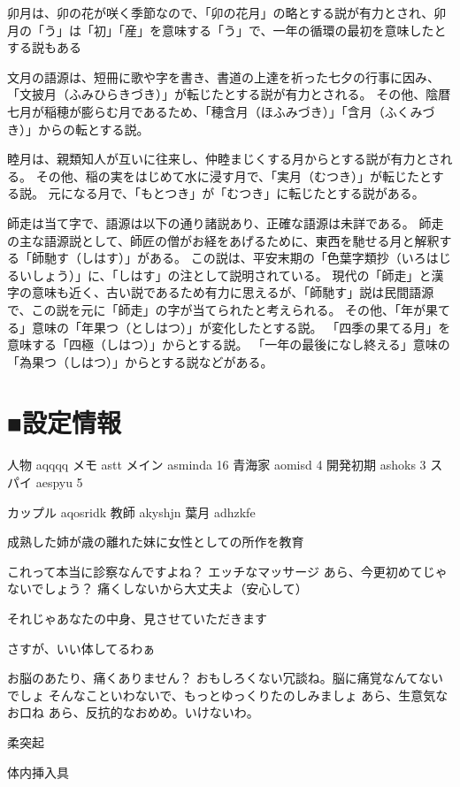 卯月は、卯の花が咲く季節なので、「卯の花月」の略とする説が有力とされ、卯月の「う」は「初」「産」を意味する「う」で、一年の循環の最初を意味したとする説もある

文月の語源は、短冊に歌や字を書き、書道の上達を祈った七夕の行事に因み、「文披月（ふみひらきづき）」が転じたとする説が有力とされる。
その他、陰暦七月が稲穂が膨らむ月であるため、「穂含月（ほふみづき）」「含月（ふくみづき）」からの転とする説。

睦月は、親類知人が互いに往来し、仲睦まじくする月からとする説が有力とされる。
その他、稲の実をはじめて水に浸す月で、「実月（むつき）」が転じたとする説。
元になる月で、「もとつき」が「むつき」に転じたとする説がある。

師走は当て字で、語源は以下の通り諸説あり、正確な語源は未詳である。
師走の主な語源説として、師匠の僧がお経をあげるために、東西を馳せる月と解釈する「師馳す（しはす）」がある。
この説は、平安末期の「色葉字類抄（いろはじるいしょう）」に、「しはす」の注として説明されている。
現代の「師走」と漢字の意味も近く、古い説であるため有力に思えるが、「師馳す」説は民間語源で、この説を元に「師走」の字が当てられたと考えられる。
その他、「年が果てる」意味の「年果つ（としはつ）」が変化したとする説。
「四季の果てる月」を意味する「四極（しはつ）」からとする説。
「一年の最後になし終える」意味の「為果つ（しはつ）」からとする説などがある。



\section{■設定情報}

人物 aqqqq
メモ astt
メイン asminda 16
青海家 aomisd 4
開発初期 ashoks 3
スパイ aespyu 5

カップル aqosridk
教師 akyshjn
葉月 adhzkfe

成熟した姉が歳の離れた妹に女性としての所作を教育

これって本当に診察なんですよね？
エッチなマッサージ 
あら、今更初めてじゃないでしょう？
痛くしないから大丈夫よ（安心して）

それじゃあなたの中身、見させていただきます

さすが、いい体してるわぁ

お脳のあたり、痛くありません？
おもしろくない冗談ね。脳に痛覚なんてないでしょ
そんなこといわないで、もっとゆっくりたのしみましょ
あら、生意気なお口ね
あら、反抗的なおめめ。いけないわ。

柔突起

体内挿入具

